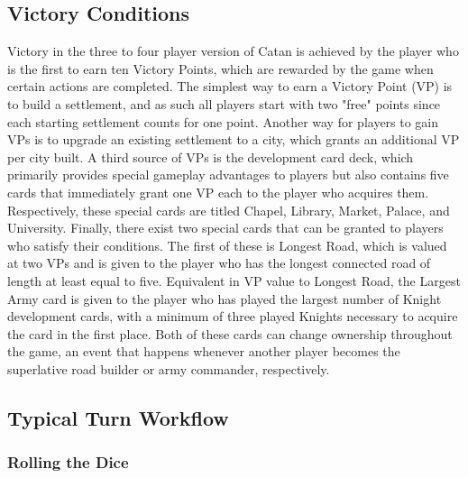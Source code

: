 \documentclass[pageno]{jpaper}
\begin{document}
\begin{doublespacing}
\hypertarget{sec:victory_conditions}{}
\subsection{Victory Conditions}

Victory in the three to four player version of Catan is achieved by the player who is the first to earn ten Victory Points, which are rewarded by the game when certain actions are completed. The simplest way to earn a Victory Point (VP) is to build a settlement, and as such all players start with two "free" points since each starting settlement counts for one point. Another way for players to gain VPs is to upgrade an existing settlement to a city, which grants an additional VP per city built. A third source of VPs is the development card deck, which primarily provides special gameplay advantages to players but also contains five cards that immediately grant one VP each to the player who acquires them. Respectively, these special cards are titled Chapel, Library, Market, Palace, and University. Finally, there exist two special cards that can be granted to players who satisfy their conditions. The first of these is Longest Road, which is valued at two VPs and is given to the player who has the longest connected road of length at least equal to five. Equivalent in VP value to Longest Road, the Largest Army card is given to the player who has played the largest number of Knight development cards, with a minimum of three played Knights necessary to acquire the card in the first place. Both of these cards can change ownership throughout the game, an event that happens whenever another player becomes the superlative road builder or army commander, respectively.

\hypertarget{sec:typical_turn_workflow}{}
\subsection{Typical Turn Workflow}

\hypertarget{sec:rolling_the_dice}{}
\subsubsection{Rolling the Dice}


\end{doublespacing}
\end{document}
